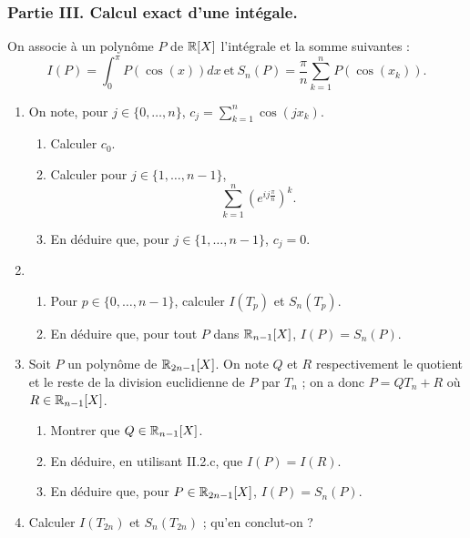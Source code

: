 \subsubsection*{Partie III. Calcul exact d'une intégale.}
On associe à un polynôme $P$ de $\mathbb{R}[X]$ l'intégrale et la somme
suivantes :
$$I(P)=\int_0^\pi P(\cos(x))dx\ \textrm{et}\
S_n(P)=\frac{\pi}{n}\sum_{k=1}^n P(\cos(x_k)).$$
\begin{enumerate}
  \item On note, pour $j\in\{0,\dots,n\}$,
  $c_j=\sum_{k=1}^n\cos(jx_k)$.
  \begin{enumerate}
    \item Calculer $c_0$.
    \item Calculer pour $j\in\{1,\dots,n-1\}$, $$\sum_{k=1}^n
    \left(e ^{ij\frac{\pi}n}\right)^k.$$
    \item En déduire que, pour $j\in\{1,\dots,n-1\}$, $c_j=0$.
  \end{enumerate}
  \item \begin{enumerate}
          \item Pour $p\in\{0,\dots,n-1\}$, calculer $I(T_p)$ et
          $S_n(T_p)$.
          \item En déduire que, pour tout $P$ dans $\mathbb{R}_{n-1}[X]$,
          $I(P)=S_n(P)$.
        \end{enumerate}
  \item Soit $P$ un polynôme de $\mathbb{R}_{2n-1}[X]$. On note $Q$ et $R$
  respectivement le quotient et le reste de la division euclidienne
  de $P$ par $T_n$ ; on a donc $P=QT_n+R$ où $R\in\mathbb{R}_{n-1}[X]$.
  \begin{enumerate}
    \item Montrer que $Q\in\mathbb{R}_{n-1}[X]$.
    \item En déduire, en utilisant II.2.c, que $I(P)=I(R)$.
    \item En déduire que, pour $P\in \mathbb{R}_{2n-1}[X]$, $I(P)=S_n(P)$.
  \end{enumerate}
  \item Calculer $I(T_{2n})$ et $S_n(T_{2n})$ ; qu'en conclut-on ?
\end{enumerate}

